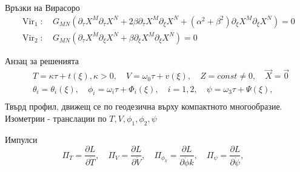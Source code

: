 \documentclass[bulg]{beamer}
\begin{document}
\begin{frame}
\begin{alertblock}{Връзки на Вирасоро}%
  \vspace{-0.5cm}
\begin{align*}
\operatorname{Vir}_{1}:\  & G_{M N}\left(\partial_{\tau} X^{M} \partial_{\tau} X^{N}+2 \beta \partial_{\tau} X^{M} \partial_{\xi} X^{N}+\left(\alpha^{2}+\beta^{2}\right) \partial_{\xi} X^{M} \partial_{\xi} X^{N}\right)=0 \\
\operatorname{Vir}_{2}:\  & G_{M N}\left(\partial_{\tau} X^{M} \partial_{\xi} X^{N}+\beta \partial_{\xi} X^{M} \partial_{\xi} X^{N}\right)=0
\end{align*}
\end{alertblock}
\alert{Анзац} за решенията 
\begin{align*}
&T=\kappa \tau+t(\xi), \kappa>0, \quad V=\omega_{0} \tau+v(\xi), \quad Z=c o n s t \neq 0, \quad \vec{X}=\overrightarrow{0} \\
&\theta_{i}=\theta_{i}(\xi), \quad \phi_{i}=\omega_{i} \tau+\Phi_{i}(\xi), \quad
i=1,2, \quad \psi=\omega_{3} \tau+\Psi(\xi),\\
\label{eq:ansatz}
\end{align*}
\alert{Твърд} профил, движещ се по геодезична върху компактното многообразие.
Изометрии - транслации по $T, V, \phi_1, \phi_2, \psi$
\begin{alertblock}{Импулси}
\begin{equation*}
\Pi_T = \frac{\partial L}{\partial \dot{T}}, \quad
\Pi_V = \frac{\partial L}{\partial \dot{V}}, \quad
\Pi_{\phi_k} = \frac{\partial L}{\partial \dot{\phi}k},\quad 
\Pi_{\psi} = \frac{\partial L}{\partial \dot{\psi}},\quad 
\end{equation*}
\end{alertblock}
\end{frame}
\end{document}
